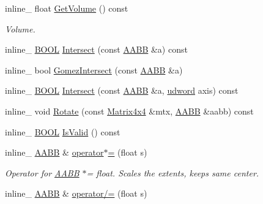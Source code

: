 \begin{DoxyCompactItemize}
\item 
\hypertarget{class_a_a_b_b_a2c888a7387ffd8fbc4144f5d63892be6}{inline\+\_\+ float \hyperlink{class_a_a_b_b_a2c888a7387ffd8fbc4144f5d63892be6}{Get\+Volume} () const }\label{class_a_a_b_b_a2c888a7387ffd8fbc4144f5d63892be6}

\begin{DoxyCompactList}\small\item\em Volume. \end{DoxyCompactList}\item 
inline\+\_\+ \hyperlink{_ice_types_8h_a050c65e107f0c828f856a231f4b4e788}{B\+O\+O\+L} \hyperlink{class_a_a_b_b_a4e1faf2a1bc32174c468dd49ac5452b3}{Intersect} (const \hyperlink{class_a_a_b_b}{A\+A\+B\+B} \&a) const 
\item 
inline\+\_\+ bool \hyperlink{class_a_a_b_b_a277bc0c18b7561ebee24739ecad805b5}{Gomez\+Intersect} (const \hyperlink{class_a_a_b_b}{A\+A\+B\+B} \&a)
\item 
inline\+\_\+ \hyperlink{_ice_types_8h_a050c65e107f0c828f856a231f4b4e788}{B\+O\+O\+L} \hyperlink{class_a_a_b_b_a18b9b090a4a5cbdbd7c809347df2ff03}{Intersect} (const \hyperlink{class_a_a_b_b}{A\+A\+B\+B} \&a, \hyperlink{_ice_types_8h_a44c6f1920ba5551225fb534f9d1a1733}{udword} axis) const 
\item 
inline\+\_\+ void \hyperlink{class_a_a_b_b_ad4f1de1a5d1a4ff71bcc8a47f7e8ca11}{Rotate} (const \hyperlink{class_matrix4x4}{Matrix4x4} \&mtx, \hyperlink{class_a_a_b_b}{A\+A\+B\+B} \&aabb) const 
\item 
inline\+\_\+ \hyperlink{_ice_types_8h_a050c65e107f0c828f856a231f4b4e788}{B\+O\+O\+L} \hyperlink{class_a_a_b_b_aef83f74a817f5ad98693b40c16548f4c}{Is\+Valid} () const 
\item 
\hypertarget{class_a_a_b_b_a7af8c6a1926fa0914d4ccc563399affb}{inline\+\_\+ \hyperlink{class_a_a_b_b}{A\+A\+B\+B} \& \hyperlink{class_a_a_b_b_a7af8c6a1926fa0914d4ccc563399affb}{operator$\ast$=} (float s)}\label{class_a_a_b_b_a7af8c6a1926fa0914d4ccc563399affb}

\begin{DoxyCompactList}\small\item\em Operator for \hyperlink{class_a_a_b_b}{A\+A\+B\+B} $\ast$= float. Scales the extents, keeps same center. \end{DoxyCompactList}\item 
\hypertarget{class_a_a_b_b_a10378a1b9a6540384a6112128cdd5972}{inline\+\_\+ \hyperlink{class_a_a_b_b}{A\+A\+B\+B} \& \hyperlink{class_a_a_b_b_a10378a1b9a6540384a6112128cdd5972}{operator/=} (float s)}\label{class_a_a_b_b_a10378a1b9a6540384a6112128cdd5972}


\end{DoxyCompactItemize}
